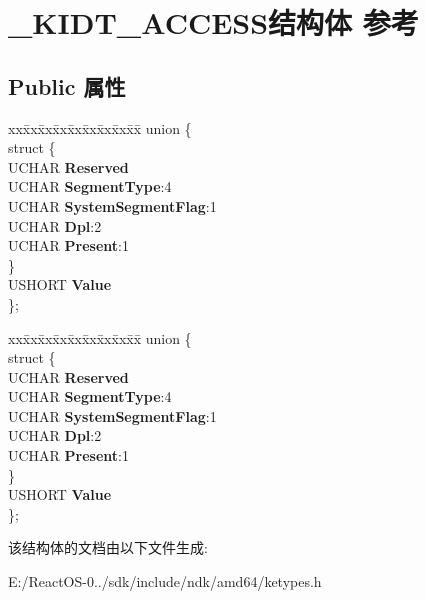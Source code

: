 \hypertarget{struct___k_i_d_t___a_c_c_e_s_s}{}\section{\+\_\+\+K\+I\+D\+T\+\_\+\+A\+C\+C\+E\+S\+S结构体 参考}
\label{struct___k_i_d_t___a_c_c_e_s_s}
\subsection*{Public 属性}
\begin{DoxyCompactItemize}
\item 
\mbox{\label{struct___k_i_d_t___a_c_c_e_s_s_a9d5e1beddefd4fbcf1df649b1350e1f9}} 
\begin{tabbing}
xx\=xx\=xx\=xx\=xx\=xx\=xx\=xx\=xx\=\kill
union \{\\
\mbox{\label{union___k_i_d_t___a_c_c_e_s_s_1_1_0D1917_abca01dfaf7228b45453e8d5858840166}} 
\>struct \{\\
\>\>UCHAR {\bfseries Reserved}\\
\>\>UCHAR {\bfseries SegmentType}:4\\
\>\>UCHAR {\bfseries SystemSegmentFlag}:1\\
\>\>UCHAR {\bfseries Dpl}:2\\
\>\>UCHAR {\bfseries Present}:1\\
\>\} \\
\>USHORT {\bfseries Value}\\
\}; \\

\end{tabbing}\item 
\mbox{\label{struct___k_i_d_t___a_c_c_e_s_s_a82ca581122a55b8ee65be157375837c5}} 
\begin{tabbing}
xx\=xx\=xx\=xx\=xx\=xx\=xx\=xx\=xx\=\kill
union \{\\
\mbox{\label{union___k_i_d_t___a_c_c_e_s_s_1_1_0D2030_a3936f9714cc9af02fffe190742228f67}} 
\>struct \{\\
\>\>UCHAR {\bfseries Reserved}\\
\>\>UCHAR {\bfseries SegmentType}:4\\
\>\>UCHAR {\bfseries SystemSegmentFlag}:1\\
\>\>UCHAR {\bfseries Dpl}:2\\
\>\>UCHAR {\bfseries Present}:1\\
\>\} \\
\>USHORT {\bfseries Value}\\
\}; \\

\end{tabbing}\end{DoxyCompactItemize}


该结构体的文档由以下文件生成\+:\begin{DoxyCompactItemize}
\item 
E\+:/\+React\+O\+S-\/0../sdk/include/ndk/amd64/ketypes.\+h\end{DoxyCompactItemize}
